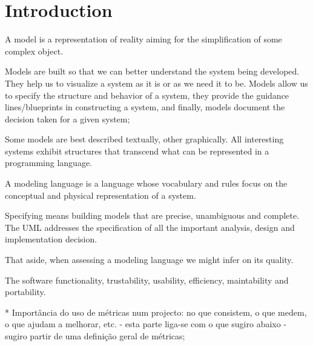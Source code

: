 \section{Introduction}

\indent
\par A model is a representation of reality aiming for the simplification of some complex object.

\par Models are built so that we can better understand the system being developed.
They help us to visualize a system as it is or as we need it to be. Models allow us to specify the structure and behavior of a system, they provide the guidance lines/blueprints in constructing a system, and finally, models document the decision taken for a given system;


\par Some models are best described textually, other graphically. All interesting systems exhibit structures that transcend what can be represented in a programming language.


\par A modeling language is a language whose vocabulary and rules focus on the conceptual and physical representation of a system.%

\par Specifying means building models that are precise, unambiguous and complete. The UML addresses the specification of all the important analysis, design and implementation decision. %


\par That aside, when assessing a modeling language we might infer on its quality.
\par The software functionality, trustability, usability, efficiency, maintability and portability.



    * Importância do uso de métricas num projecto: no que consistem, o que medem, o que ajudam a melhorar, etc. - esta parte liga-se com o que sugiro abaixo - sugiro partir de uma definição geral de métricas;\\
    
